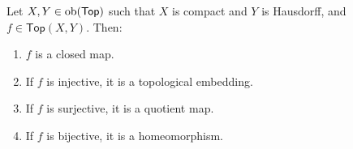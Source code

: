 \begin{lemma}
	Let $X,Y \in \operatorname{ob}(\mathsf{Top})$ such that $X$ is compact and $Y$ is Hausdorff, and $f \in \mathsf{Top}(X,Y)$. Then:
	\begin{enumerate}[label = \textup{(}\alph*\textup{)},wide = 0pt]
		\item $f$ is a closed map.
		\item If $f$ is injective, it is a topological embedding.
		\item If $f$ is surjective, it is a quotient map.
		\item If $f$ is bijective, it is a homeomorphism.
	\end{enumerate}
	\label{lem:closed_map_lemma}
\end{lemma}
